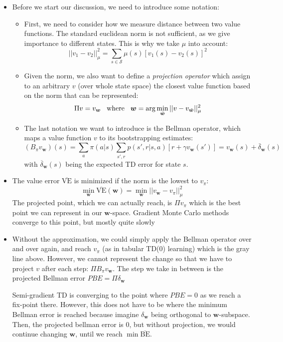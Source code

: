 \begin{itemize}
	\item Before we start our discussion, we need to introduce some notation:
	\begin{itemize}
		\item First, we need to consider how we measure distance between two value functions. The standard euclidean norm is not sufficient, as we give importance to different states. This is why we take $\mu$ into account:
		$$||v_1-v_2||_{\mu}^2 = \sum_{s\in\mathcal{S}} \mu(s)\left[v_1(s)-v_2(s)\right]^2$$
		\item Given the norm, we also want to define a \textit{projection operator} which assign to an arbitrary $v$ (over whole state space) the closest value function based on the norm that can be represented:
		$$\Pi v = v_{\bm{w}}\hspace{3mm}\text{where}\hspace{3mm}\bm{w}=\arg\min_{\tilde{\bm{w}}}||v-v_{\tilde{\bm{w}}}||_{\mu}^2 $$
		\item The last notation we want to introduce is the Bellman operator, which maps a value function $v$ to its bootstrapping estimates:
		$$(B_{\pi}v_{\bm{w}})(s) = \sum_a \pi(a|s)\sum_{s',r}p(s',r|s,a)[r+\gamma v_{\bm{w}}(s')] = v_{\bm{w}}(s) + \overline{\delta}_{\bm{w}}(s)$$
		with $\overline{\delta}_{\bm{w}}(s)$ being the expected TD error for state $s$.
	\end{itemize}
	\item The value error $\overline{\text{VE}}$ is minimized if the norm is the lowest to $v_{\pi}$: $$\min_{\bm{w}} \overline{\text{VE}}(\bm{w}) = \min_{\bm{w}} ||v_{\bm{w}}-v_{\pi}||_{\mu}^2 $$
	The projected point, which we can actually reach, is $\Pi v_{\pi}$ which is the best point we can represent in our $\bm{w}$-space. Gradient Monte Carlo methods converge to this point, but mostly quite slowly
	\item Without the approximation, we could simply apply the Bellman operator  over and over again, and reach $v_{\pi}$ (as in tabular TD(0) learning) which is the gray line above. However, we cannot represent the change so that we have to project $v$ after each step: $\Pi B_{\pi}v_{\bm{w}}$. The step we take in between is the projected Bellman error $PBE=\Pi\delta_{\bm{w}}$ 
	
	Semi-gradient TD is converging to the point where $PBE=0$ as we reach a fix-point there. However, this does not have to be where the minimum Bellman error is reached because imagine $\delta_{\bm{w}}$ being orthogonal to $\bm{w}$-subspace. Then, the projected bellman error is 0, but without projection, we would continue changing $\bm{w}$, until we reach $\min \overline{\text{BE}}$.
	

\end{itemize}
